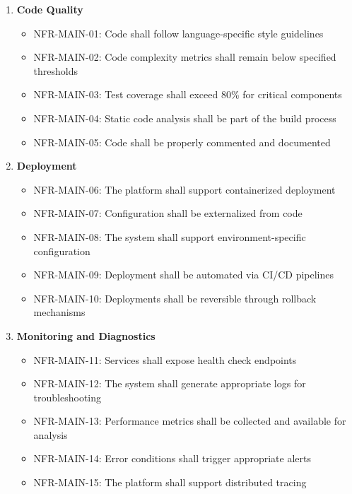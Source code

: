 \begin{enumerate}
   \item \textbf{Code Quality}
   \begin{itemize}
      \item NFR-MAIN-01: Code shall follow language-specific style guidelines
      \item NFR-MAIN-02: Code complexity metrics shall remain below specified thresholds
      \item NFR-MAIN-03: Test coverage shall exceed 80\% for critical components
      \item NFR-MAIN-04: Static code analysis shall be part of the build process
      \item NFR-MAIN-05: Code shall be properly commented and documented
   \end{itemize}

   \item \textbf{Deployment}
   \begin{itemize}
      \item NFR-MAIN-06: The platform shall support containerized deployment
      \item NFR-MAIN-07: Configuration shall be externalized from code
      \item NFR-MAIN-08: The system shall support environment-specific configuration
      \item NFR-MAIN-09: Deployment shall be automated via CI/CD pipelines
      \item NFR-MAIN-10: Deployments shall be reversible through rollback mechanisms
   \end{itemize}

   \item \textbf{Monitoring and Diagnostics}
   \begin{itemize}
      \item NFR-MAIN-11: Services shall expose health check endpoints
      \item NFR-MAIN-12: The system shall generate appropriate logs for troubleshooting
      \item NFR-MAIN-13: Performance metrics shall be collected and available for analysis
      \item NFR-MAIN-14: Error conditions shall trigger appropriate alerts
      \item NFR-MAIN-15: The platform shall support distributed tracing
   \end{itemize}


\end{enumerate}
